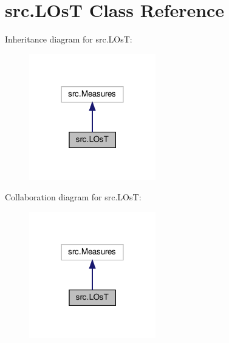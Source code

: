 \hypertarget{classsrc_1_1LOsT}{}\section{src.\+L\+OsT Class Reference}
\label{classsrc_1_1LOsT}


Inheritance diagram for src.\+L\+OsT\+:
\nopagebreak
\begin{figure}[H]
\begin{center}
\leavevmode
\includegraphics[width=156pt]{classsrc_1_1LOsT__inherit__graph}
\end{center}
\end{figure}


Collaboration diagram for src.\+L\+OsT\+:
\nopagebreak
\begin{figure}[H]
\begin{center}
\leavevmode
\includegraphics[width=156pt]{classsrc_1_1LOsT__coll__graph}
\end{center}
\end{figure}
